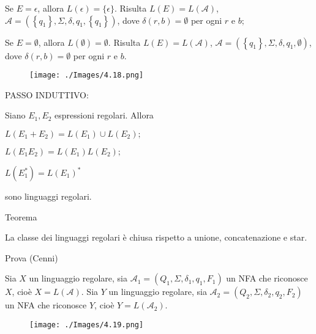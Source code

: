 Se $E=\epsilon$, allora $L(\epsilon)=\{\epsilon\} .$ Risulta $L(E)=L(\mathcal{A})$,
$\mathcal{A}=\left(\left\{q_{1}\right\}, \Sigma, \delta, q_{1},\left\{q_{1}\right\}\right)$, dove $\delta(r, b)=\emptyset$ per ogni $r$ e $b ;$

Se $E=\emptyset$, allora $L(\emptyset)=\emptyset$. Risulta $L(E)=L(\mathcal{A})$,
$\mathcal{A}=\left(\left\{q_{1}\right\}, \Sigma, \delta, q_{1}, \emptyset\right)$, dove $\delta(r, b)=\emptyset$ per ogni $r$ e $b .$

\begin{figure}[hbpt!]
    \centering
    \texttt{[image: ./Images/4.18.png]}
\end{figure}
\FloatBarrier

PASSO INDUTTIVO:

Siano $E_{1}, E_{2}$ espressioni regolari. Allora

$L\left(E_{1}+E_{2}\right)=L\left(E_{1}\right) \cup L\left(E_{2}\right) ;$

$L\left(E_{1} E_{2}\right)=L\left(E_{1}\right) L\left(E_{2}\right) ;$

$L\left(E_{1}^{*}\right)=L\left(E_{1}\right)^{*}$

sono linguaggi regolari.

\vspace{5mm}

Teorema

La classe dei linguaggi regolari è chiusa rispetto a unione,
concatenazione e star.

Prova (Cenni) 

Sia $X$ un linguaggio regolare, sia $\mathcal{A}_{1}=\left(Q_{1}, \Sigma, \delta_{1}, q_{1}, F_{1}\right)$ un NFA che riconosce $X$, cioè $X=L(\mathcal{A})$. Sia $Y$ un linguaggio regolare, sia $\mathcal{A}_{2}=\left(Q_{2}, \Sigma, \delta_{2}, q_{2}, F_{2}\right)$ un NFA che riconosce $Y$, cioè $Y=L\left(\mathcal{A}_{2}\right)$.

\begin{figure}[hbpt!]
    \centering
    \texttt{[image: ./Images/4.19.png]}
\end{figure}
\FloatBarrier

